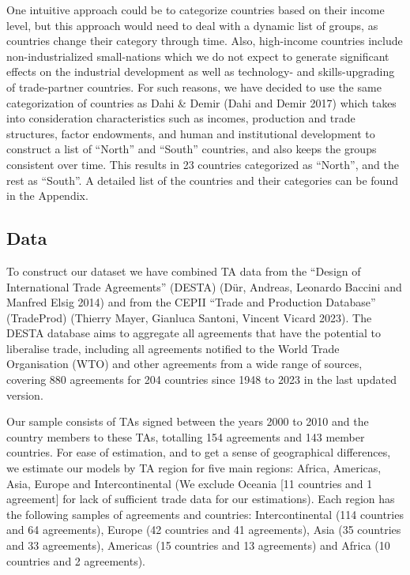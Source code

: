 \documentclass[12pt]{article}%
\begin{document}
One intuitive approach could be to categorize countries based on their
income level, but this approach would need to deal with a dynamic list
of groups, as countries change their category through time. Also,
high-income countries include non-industrialized small-nations which we
do not expect to generate significant effects on the industrial
development as well as technology- and skills-upgrading of trade-partner
countries. For such reasons, we have decided to use the same
categorization of countries as Dahi \& Demir (Dahi and Demir 2017) which
takes into consideration characteristics such as incomes, production and
trade structures, factor endowments, and human and institutional
development to construct a list of ``North'' and ``South'' countries,
and also keeps the groups consistent over time. This results in 23
countries categorized as ``North'', and the rest as ``South''. A
detailed list of the countries and their categories can be found in the
Appendix.
%
\subsection{Data}%
\label{subsec:Data}%

%
To construct our dataset we have combined TA data from the ``Design of
International Trade Agreements'' (DESTA) (Dür, Andreas, Leonardo Baccini
and Manfred Elsig 2014) and from the CEPII ``Trade and Production
Database'' (TradeProd) (Thierry Mayer, Gianluca Santoni, Vincent Vicard
2023). The DESTA database aims to aggregate all agreements that have the
potential to liberalise trade, including all agreements notified to the
World Trade Organisation (WTO) and other agreements from a wide range of
sources, covering 880 agreements for 204 countries since 1948 to 2023 in
the last updated version.

Our sample consists of TAs signed between the years 2000 to 2010 and the
country members to these TAs, totalling 154 agreements and 143 member
countries. For ease of estimation, and to get a sense of geographical
differences, we estimate our models by TA region for five main regions:
Africa, Americas, Asia, Europe and Intercontinental (We exclude Oceania
{[}11 countries and 1 agreement{]} for lack of sufficient trade data for
our estimations). Each region has the following samples of agreements
and countries: Intercontinental (114 countries and 64 agreements),
Europe (42 countries and 41 agreements), Asia (35 countries and 33
agreements), Americas (15 countries and 13 agreements) and Africa (10
countries and 2 agreements).
\end{document}

